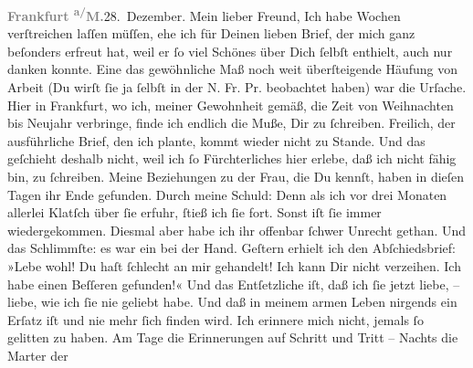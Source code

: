 \begin{ledgroupsized}[t]{13cm}
           \pstart
           \raggedleft{}\textcolor{gray}{\textbf{Frankfurt \textsuperscript{a/}M.}}28. Dezember.\pend
           \pstart{}Mein lieber Freund,\pend\pstart
           Ich habe Wochen verſtreichen laſſen müſſen, ehe ich für Deinen lieben Brief, der mich
               ganz beſonders erfreut hat, weil er ſo viel Schönes über Dich ſelbſt enthielt, auch
               nur danken konnte. Eine das gewöhnliche Maß noch weit überſteigende Häufung von
               Arbeit (Du wirſt ſie ja ſelbſt in der N. Fr. Pr.
               beobachtet haben) war die Urſache. Hier in Frankfurt, wo ich, meiner Gewohnheit gemäß, die Zeit von Weihnachten bis Neujahr
               verbringe, finde ich endlich die {\pb}Muße, Dir zu
               ſchreiben. Freilich, der ausführliche Brief, den ich plante, kommt wieder nicht zu
               Stande. Und das geſchieht deshalb nicht, weil ich ſo Fürchterliches hier erlebe, daß
               ich nicht fähig bin, zu ſchreiben. Meine Beziehungen zu der Frau, die Du kennſt, haben in dieſen Tagen
               ihr Ende gefunden. Durch meine Schuld: Denn als ich vor drei Monaten allerlei Klatſch
               über ſie erfuhr, ſtieß ich ſie fort. Sonst iſt ſie immer wiedergekommen. Diesmal aber
               habe ich ihr offenbar ſchwer Unrecht gethan. Und das Schlimmſte: es war ein \label{K_L03231-1v}\label{K_L03231-1h} bei der Hand.
                  Geſtern erhielt ich den Abſchiedsbrief: »Lebe wohl!
               Du haſt ſchlecht an mir gehandelt! Ich kann Dir nicht verzeihen. Ich habe einen Beſſeren gefunden!«\pend
           \pstart
           Und das Entſetzliche iſt, daß ich ſie jetzt liebe, – liebe, wie ich ſie nie geliebt
               habe. Und daß in meinem armen Leben nirgends ein Erſatz iſt und nie mehr ſich finden
               wird. Ich erinnere mich nicht, jemals ſo gelitten zu haben. Am Tage die Erinnerungen
               auf Schritt und Tritt – Nachts die Marter {\pb}der

\end{ledgroupsized}
